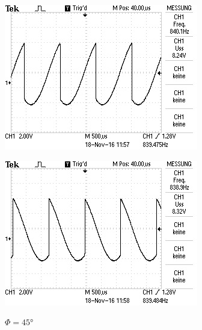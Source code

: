 \begin{figure}[!h]
\begin{minipage}[t]{0.3\textwidth}
  \end{minipage}
  \hspace{12pt}
  \vspace{5pt}
  \begin{minipage}[t]{0.3\textwidth}
    \includegraphics[width=\textwidth]{Bilder/225.jpeg}
    \label{fig:105}
    \caption{$\Phi=15\si{\degree}$}
  \end{minipage}
  \hspace{12pt}
  \vspace{5pt}
  \begin{minipage}[t]{0.3\textwidth}
    \includegraphics[width=\textwidth]{Bilder/330.jpeg}
    \label{fig:330}
    \caption{$\Phi=45\si{\degree}$}
  \end{minipage}
  \hspace{12pt}
  \vspace{5pt}
\end{figure}
